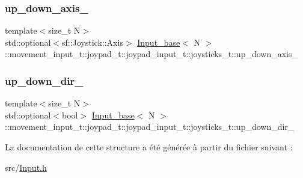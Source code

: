 \subsubsection{\texorpdfstring{up\+\_\+down\+\_\+axis\+\_\+}{up\_down\_axis\_}}
{\footnotesize\ttfamily template$<$size\+\_\+t N$>$ \\
std\+::optional$<$sf\+::\+Joystick\+::\+Axis$>$ \hyperlink{class_input__base}{Input\+\_\+base}$<$ N $>$\+::movement\+\_\+input\+\_\+t\+::joypad\+\_\+t\+::joypad\+\_\+input\+\_\+t\+::joysticks\+\_\+t\+::up\+\_\+down\+\_\+axis\+\_\+}

\mbox{\label{struct_input__base_1_1movement__input__t_1_1joypad__t_1_1joypad__input__t_1_1joysticks__t_a70ec58fb91a56fc7679773b4b4b595f7}} 
\subsubsection{\texorpdfstring{up\+\_\+down\+\_\+dir\+\_\+}{up\_down\_dir\_}}
{\footnotesize\ttfamily template$<$size\+\_\+t N$>$ \\
std\+::optional$<$bool$>$ \hyperlink{class_input__base}{Input\+\_\+base}$<$ N $>$\+::movement\+\_\+input\+\_\+t\+::joypad\+\_\+t\+::joypad\+\_\+input\+\_\+t\+::joysticks\+\_\+t\+::up\+\_\+down\+\_\+dir\+\_\+}



La documentation de cette structure a été générée à partir du fichier suivant \+:\begin{DoxyCompactItemize}
\item 
src/\hyperlink{_input_8h}{Input.\+h}\end{DoxyCompactItemize}
